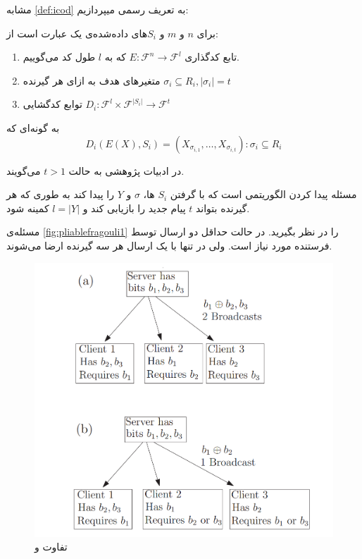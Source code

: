 	مشابه
	 \autoref{def:icod}
	 به تعریف رسمی
	 \picodt
	 میپردازیم:
\begin{definition}[\picodt]
	\label{def:picodt}
	برای
	$n$
	و
	$m$
	و
	$S_i$های 
 داده‌شده‌ی یک
	\picodt
	عبارت است از:
	\begin{enumerate}
		\item 
		تابع کدگذاری
		$E: \mathcal{F}^n \rightarrow \mathcal{F}^l$
		که به 
		$l$
		طول کد می‌گوییم.
		\item متغیرهای هدف به ازای هر گیرنده
		$\sigma_i \subseteq R_i,  |\sigma_i| = t$
		\item 
		توابع کدگشایی 
		$D_i: \mathcal{F}^l \times \mathcal{F}^{|S_i|} \rightarrow \mathcal{F}^t$
	\end{enumerate}
	به گونه‌ای که
	$$D_i(E(X), S_i) = (X_{\sigma_{i,1}}, \ldots, X_{\sigma_{i,t}}): \sigma_i \subseteq R_i$$
\end{definition}

در ادبیات پژوهشی به حالت
$t > 1$
می‌گویند.

مسئله 
\picodt
پیدا کردن الگوریتمی است که با گرفتن 
$S_i$
ها،
$\sigma$
و
$Y$
را پیدا کند به طوری که هر گیرنده بتواند
$t$
پیام جدید را بازیابی کند و 
$l = |Y|$
کمینه شود.

\begin{remark}
مسئله‌ی 
\autoref{fig:pliablefragouli1}
را در نظر بگیرید. در حالت 
\icod
 حداقل دو ارسال توسط فرستنده مورد نیاز است. ولی در
 \picod
 تنها با یک ارسال هر سه گیرنده ارضا می‌شوند.
 \begin{figure}[H]
 	\centering
 	\includegraphics[width=0.6\linewidth]{figs/ch3/pliable_fragouli1}
 	\caption[تفاوت
 	\icod
 	و
 	\picod]{تفاوت
 		\icod
 		و
 		\picod
 		\cite{pliablefirstpaper}}
 	\label{fig:pliablefragouli1}
 \end{figure}
\end{remark}

